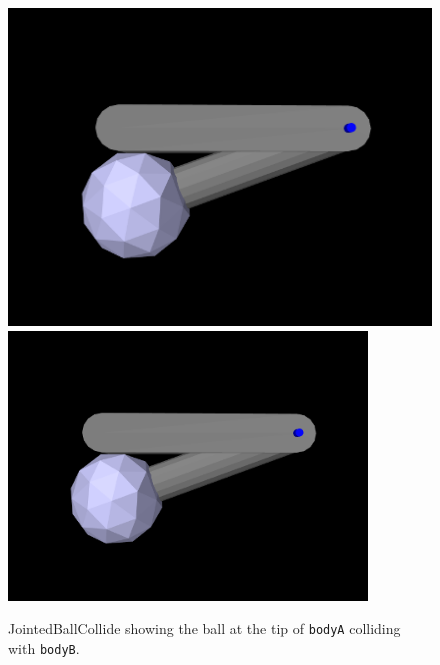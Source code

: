 \begin{figure}[ht]
\begin{center}
\iflatexml
 \includegraphics[]{images/JointedBallCollide}
\else
 \includegraphics[width=3.75in]{images/JointedBallCollide}
\fi
\end{center}
\caption{JointedBallCollide showing the ball at the tip of 
{\tt bodyA} colliding with {\tt bodyB}.}
\label{JointedBallCollide:fig}
\end{figure}

